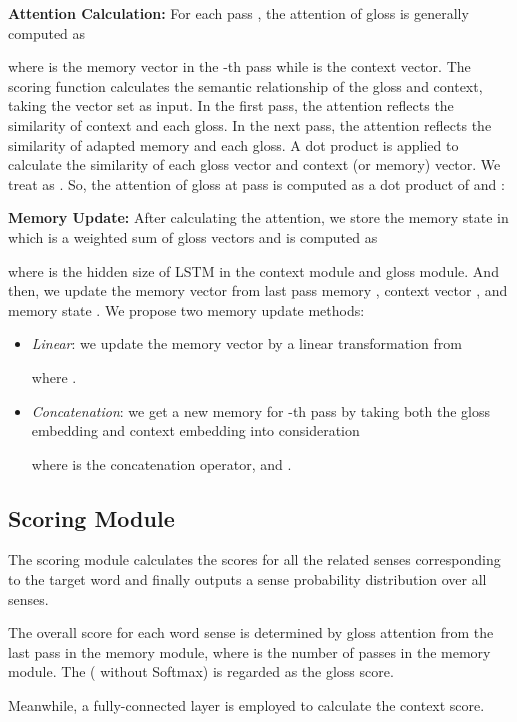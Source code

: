 \documentclass[11pt,a4paper]{article}
\begin{document}
\textbf{Attention Calculation:}
For each pass , the attention  of gloss  is generally computed as

where  is the memory vector in the -th pass while  is the context vector.
The scoring function  calculates the semantic relationship of the gloss and context, taking the vector set  as input.
In the first pass, the attention reflects the similarity of context and each gloss.
In the next pass, the attention reflects the similarity of adapted memory and each gloss.
A dot product is applied to calculate the similarity of each gloss vector and context (or memory) vector.
We treat  as .
So, the attention  of gloss  at pass  is computed as a dot product of  and :



\textbf{Memory Update:}
After calculating the attention, we store the memory state in  which is a weighted sum of gloss vectors and is computed as

where  is the hidden size of LSTM in the context module and gloss module.
And then, we update the memory vector  from last pass memory , context vector , and memory state .
We propose two memory update methods:
\begin{itemize}
  \item {\em Linear}: we update the memory vector  by a linear transformation from 

    where .

  \item {\em Concatenation}: we get a new memory for -th pass by taking both the gloss embedding and context embedding into consideration

    where  is the concatenation operator,  and .
\end{itemize}

\subsection{Scoring Module} \label{subsec:AnswerModule}
The scoring module calculates the scores for all the related senses  corresponding to the target word  and finally outputs a sense probability distribution over all senses.


The overall score for each word sense is determined by gloss attention  from the last pass in the memory module, where  is the number of passes in the memory module.
The  (  without Softmax) is regarded as the gloss score.


Meanwhile, a fully-connected layer is employed to calculate the context score.
\end{document}

